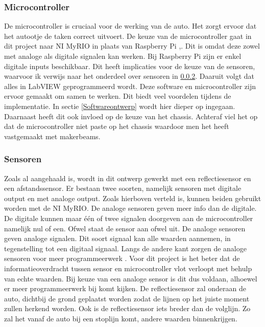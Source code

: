 \documentclass[a4paper,twoside,kulak]{kulakreport} %
\begin{document}
\subsubsection{Microcontroller}
De microcontroller is cruciaal voor de werking van de auto. Het zorgt ervoor dat het autootje de taken correct uitvoert. De keuze van de microcontroller gaat in dit project naar NI MyRIO in plaats van Raspberry Pi \cite{nimyrio},\cite{RaspberryPi}.
Dit is omdat deze zowel met analoge als digitale signalen kan werken. 
Bij Raspberry Pi zijn er enkel digitale inputs beschikbaar. Dit heeft implicaties voor de keuze van de sensoren, waarvoor ik verwijs naar het onderdeel over sensoren in \ref{Sensoren}.
Daaruit volgt dat alles in LabVIEW geprogrammeerd wordt.
Deze software en microcontroller zijn ervoor gemaakt om samen te werken. Dit biedt veel voordelen tijdens de implementatie. In sectie \ref{Softwareontwerp} wordt hier dieper op ingegaan. %
Daarnaast heeft dit ook invloed op de keuze van het chassis. Achteraf viel het op dat de microcontroller niet paste op het chassis waardoor men het heeft vastgemaakt met makerbeams.

\label{Microcontroller}

\subsubsection{Sensoren} \label{Sensoren}
Zoals al aangehaald is, wordt in dit ontwerp gewerkt met een reflectiesensor en een afstandssensor. Er bestaan twee soorten, namelijk sensoren met digitale output en met analoge output. Zoals hierboven verteld is, kunnen beiden gebruikt worden met de NI MyRIO. De analoge sensoren geven meer info dan de digitale. De digitale kunnen maar één of twee signalen doorgeven aan de microcontroller namelijk nul of een. Ofwel staat de sensor aan ofwel uit. De analoge sensoren geven analoge signalen. Dit soort signaal kan alle waarden aannemen, in tegenstelling tot een digitaal signaal. Langs de andere kant zorgen de analoge sensoren voor meer programmeerwerk \cite{DigitaalOfAnaloog}. Voor dit project is het beter dat de informatieoverdracht tussen sensor en microcontroller vlot verloopt met behulp van echte waarden. Bij keuze van een analoge sensor is dit dus voldaan, alhoewel er meer programmeerwerk bij komt kijken. %
De reflectiesensor zal onderaan de auto, dichtbij de grond geplaatst worden zodat de lijnen op het juiste moment zullen herkend worden. Ook is de reflectiesensor iets breder dan de volglijn. Zo zal het vanaf de auto bij een stoplijn komt, andere waarden binnenkrijgen.
\end{document}
